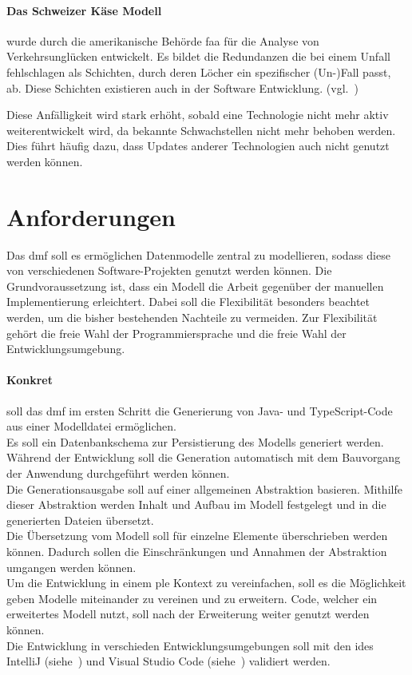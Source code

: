 \documentclass[./einleitung.tex]{subfiles}
\begin{document}
\begin{enumerate}
\begin{center}
    \paragraph{Das Schweizer Käse Modell} wurde durch die amerikanische Behörde \acrshort{faa} für die Analyse von Verkehrsunglücken entwickelt.
    Es bildet die Redundanzen die bei einem Unfall fehlschlagen als Schichten, durch deren Löcher ein spezifischer (Un-)Fall passt, ab.
    Diese Schichten existieren auch in der Software Entwicklung. (vgl.~\cite{bergeon2009swiss})
\end{center}
Diese Anfälligkeit wird stark erhöht, sobald eine Technologie nicht mehr aktiv weiterentwickelt wird, da bekannte Schwachstellen nicht mehr behoben werden.
Dies führt häufig dazu, dass Updates anderer Technologien auch nicht genutzt werden können.
\end{enumerate}
\section{Anforderungen}\label{sec:aufgabenstellung}
Das \acrfull{dmf} soll es ermöglichen Datenmodelle zentral zu modellieren, sodass diese von verschiedenen Software-Projekten genutzt werden können.
Die Grundvoraussetzung ist, dass ein Modell die Arbeit gegenüber der manuellen Implementierung erleichtert.
Dabei soll die Flexibilität besonders beachtet werden, um die bisher bestehenden Nachteile zu vermeiden.
Zur Flexibilität gehört die freie Wahl der Programmiersprache und die freie Wahl der Entwicklungsumgebung.

\paragraph{Konkret} soll das \acrshort{dmf} im ersten Schritt die Generierung von Java- und TypeScript-Code aus einer Modelldatei ermöglichen.\\
Es soll ein Datenbankschema zur Persistierung des Modells generiert werden.\\
Während der Entwicklung soll die Generation automatisch mit dem Bauvorgang der Anwendung durchgeführt werden können.\\
Die Generationsausgabe soll auf einer allgemeinen Abstraktion basieren.
Mithilfe dieser Abstraktion werden Inhalt und Aufbau im Modell festgelegt und in die generierten Dateien übersetzt.\\
Die Übersetzung vom Modell soll für einzelne Elemente überschrieben werden können.
Dadurch sollen die Einschränkungen und Annahmen der Abstraktion umgangen werden können.\\
Um die Entwicklung in einem \acrshort{ple} Kontext zu vereinfachen, soll es die Möglichkeit geben Modelle miteinander zu vereinen und zu erweitern.
Code, welcher ein erweitertes Modell nutzt, soll nach der Erweiterung weiter genutzt werden können.\\
Die Entwicklung in verschieden Entwicklungsumgebungen soll mit den \acrshort{ide}s IntelliJ (siehe~\cite{intellij}) und Visual Studio Code (siehe~\cite{vscode}) validiert werden.\\
\end{document}
